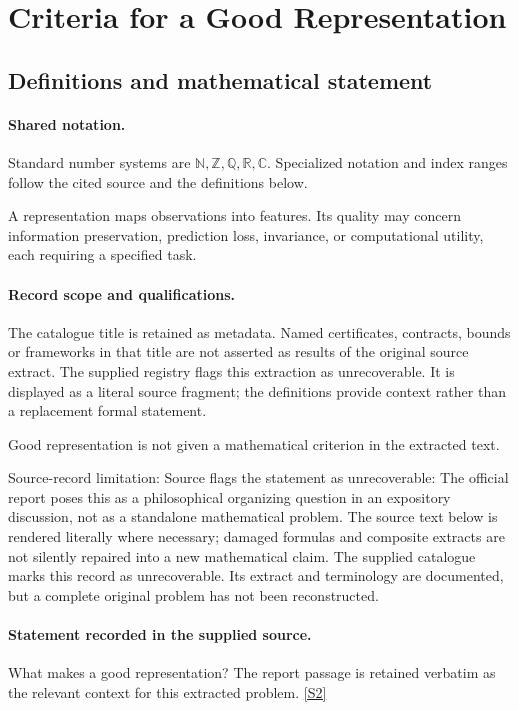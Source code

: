 \documentclass[11pt]{article}
\newcommand{\sref}[2]{\hyperlink{source:#1:#2}{[S#2]}}
\begin{document}
\section{Criteria for a Good Representation}\label{statement}

\subsection{Definitions and mathematical statement}

\paragraph{Shared notation.}Standard number systems are $\mathbb N,\mathbb Z,\mathbb Q,\mathbb R,\mathbb C$. Specialized notation and index ranges follow the cited source and the definitions below.


A representation maps observations into features. Its quality may concern information preservation, prediction loss, invariance, or computational utility, each requiring a specified task.
\paragraph{Record scope and qualifications.}
The catalogue title is retained as metadata. Named certificates, contracts, bounds or frameworks in that title are not asserted as results of the original source extract.
The supplied registry flags this extraction as unrecoverable. It is displayed as a literal source fragment; the definitions provide context rather than a replacement formal statement.

Good representation is not given a mathematical criterion in the extracted text.

Source-record limitation: Source flags the statement as unrecoverable: The official report poses this as a philosophical organizing question in an expository discussion, not as a standalone mathematical problem.
The source text below is rendered literally where necessary; damaged formulas and composite extracts are not silently repaired into a new mathematical claim.
The supplied catalogue marks this record as unrecoverable. Its extract and terminology are documented, but a complete original problem has not been reconstructed.
\paragraph{Statement recorded in the supplied source.}
What makes a good representation? The report passage is retained verbatim as the relevant context for this extracted problem. \sref{statement}{2}
\end{document}
